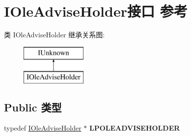 \hypertarget{interface_i_ole_advise_holder}{}\section{I\+Ole\+Advise\+Holder接口 参考}
\label{interface_i_ole_advise_holder}
类 I\+Ole\+Advise\+Holder 继承关系图\+:\begin{figure}[H]
\begin{center}
\leavevmode
\includegraphics[height=2.000000cm]{interface_i_ole_advise_holder}
\end{center}
\end{figure}
\subsection*{Public 类型}
\begin{DoxyCompactItemize}
\item 
\mbox{\label{interface_i_ole_advise_holder_ad26067bc2cb4ff6b3bf0415c4764300f}} 
typedef \hyperlink{interface_i_ole_advise_holder}{I\+Ole\+Advise\+Holder} $\ast$ {\bfseries L\+P\+O\+L\+E\+A\+D\+V\+I\+S\+E\+H\+O\+L\+D\+ER}
\end{DoxyCompactItemize}
